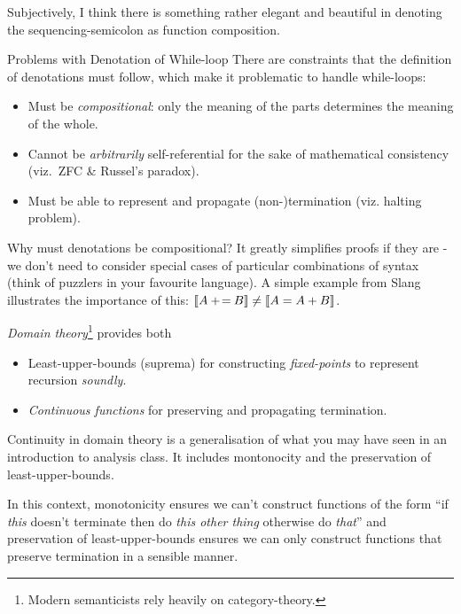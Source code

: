 Subjectively, I think there is something rather elegant and beautiful in
denoting the sequencing-semicolon as function composition.

\begin{frame}{Problems with Denotation of While-loop}
    There are constraints that the definition of denotations must follow,
    which make it problematic to handle while-loops:
    \pause
    \begin{itemize}[<+->]
        \item Must be \emph{compositional}: only the meaning of the parts
            determines the meaning of the whole.
        \item Cannot be \emph{arbitrarily} self-referential for the
            sake of mathematical consistency (viz.~ZFC \& Russel's paradox).
        \item Must be able to represent and propagate (non-)termination (viz.
            halting problem).
    \end{itemize}
\end{frame}

Why must denotations be compositional? It greatly simplifies proofs if they
are - we don't need to consider special cases of particular combinations of
syntax (think of puzzlers in your favourite language). A simple example from
Slang illustrates the importance of this: $\mathcal{} [\![ A \mathbin{+\!=} B ]\!] \neq
\mathcal{} [\![ A = A + B ]\!]$.

\begin{frame}
    \emph{Domain theory}\footnote{Modern semanticists rely heavily on category-theory.} provides both
    \pause
    \begin{itemize}[<+->]
        \item Least-upper-bounds (suprema) for constructing \emph{fixed-points} to represent recursion \emph{soundly}.
        \item \emph{Continuous functions} for preserving and propagating termination.
    \end{itemize}
\end{frame}

Continuity in domain theory is a generalisation of what you may have seen in
an introduction to analysis class. It includes montonocity and the
preservation of least-upper-bounds.

In this context, monotonicity ensures we can't construct functions of the
form ``if \emph{this} doesn't terminate then do \emph{this other thing}
otherwise do \emph{that}'' and preservation of least-upper-bounds ensures we
can only construct functions that preserve termination in a sensible manner.

